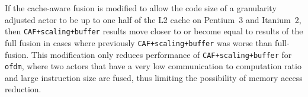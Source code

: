 If the cache-aware fusion is modified to allow the code size of a 
granularity adjusted actor to be up to one half of the L2 cache on 
Pentium~3 and Itanium~2, then \texttt{CAF+scaling+buffer} results
move closer to or become equal to results of the full fusion in cases where
previously \texttt{CAF+scaling+buffer} was worse than full-fusion.
This modification only reduces performance of \texttt{CAF+scaling+buffer}
for \texttt{ofdm}, where two actors that have a very low communication 
to computation ratio and large instruction size are fused, thus 
limiting the possibility of memory access reduction. 





